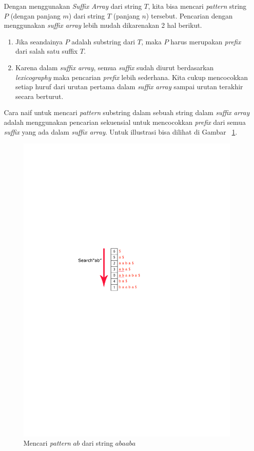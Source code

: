 Dengan menggunakan \textit{Suffix Array} dari string $T$, kita bisa mencari \textit{pattern} string $P$ (dengan panjang $m$) dari string $T$ (panjang $n$) tersebut. Pencarian dengan menggunakan \textit{suffix array} lebih mudah dikarenakan 2 hal berikut.

\begin{enumerate}
	\item Jika seandainya $P$ adalah substring dari $T$, maka $P$ harus merupakan \textit{prefix} dari salah satu {suffix} $T$. 
	\item Karena dalam \textit{suffix array}, semua \textit{suffix} sudah diurut berdasarkan \textit{lexicography} maka pencarian \textit{prefix} lebih sederhana. Kita cukup mencocokkan setiap huruf dari urutan pertama dalam \textit{suffix array} sampai urutan terakhir secara berturut. 
\end{enumerate}

Cara naif untuk mencari \textit{pattern} substring dalam sebuah string dalam \textit{suffix array} adalah menggunakan pencarian sekuensial untuk mencocokkan \textit{prefix} dari semua \textit{suffix} yang ada dalam \textit{suffix array}. Untuk illustrasi bisa dilihat di Gambar ~\ref{fig:searchABSuffixArraySequential}.

	\begin{figure}
		\includegraphics{fig/searchABSuffixArraySequential.png}%
		\caption{Mencari \textit{pattern} $ab$ dari string $abaaba$}%
		\label{fig:searchABSuffixArraySequential}%
	\end{figure}

